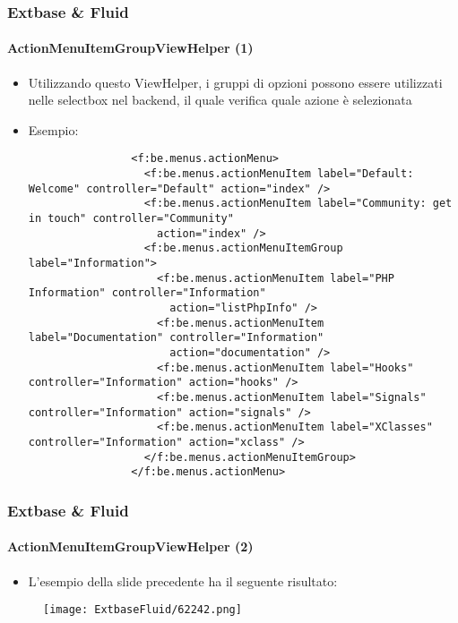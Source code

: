 \begin{frame}[fragile]
	\frametitle{Extbase \& Fluid}
	\framesubtitle{ActionMenuItemGroupViewHelper (1)}

	\lstset{basicstyle=\tiny\ttfamily}

	\begin{itemize}

		\item Utilizzando questo ViewHelper, i gruppi di opzioni possono essere utilizzati nelle selectbox nel backend,
			il quale verifica quale azione è selezionata

		\item Esempio:
			\begin{lstlisting}
				<f:be.menus.actionMenu>
				  <f:be.menus.actionMenuItem label="Default: Welcome" controller="Default" action="index" />
				  <f:be.menus.actionMenuItem label="Community: get in touch" controller="Community"
				    action="index" />
				  <f:be.menus.actionMenuItemGroup label="Information">
				    <f:be.menus.actionMenuItem label="PHP Information" controller="Information"
				      action="listPhpInfo" />
				    <f:be.menus.actionMenuItem label="Documentation" controller="Information"
				      action="documentation" />
				    <f:be.menus.actionMenuItem label="Hooks" controller="Information" action="hooks" />
				    <f:be.menus.actionMenuItem label="Signals" controller="Information" action="signals" />
				    <f:be.menus.actionMenuItem label="XClasses" controller="Information" action="xclass" />
				  </f:be.menus.actionMenuItemGroup>
				</f:be.menus.actionMenu>
			\end{lstlisting}

	\end{itemize}

\end{frame}


\begin{frame}[fragile]
	\frametitle{Extbase \& Fluid}
	\framesubtitle{ActionMenuItemGroupViewHelper (2)}

	\begin{itemize}
		\item L'esempio della slide precedente ha il seguente risultato:
	\end{itemize}

	\begin{figure}
		\texttt{[image: ExtbaseFluid/62242.png]}
	\end{figure}

\end{frame}

